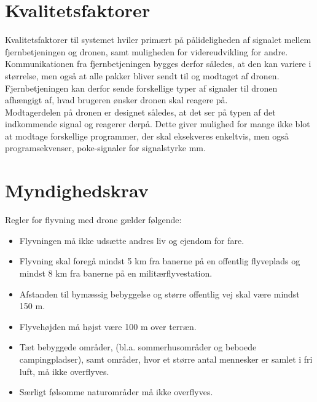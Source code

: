 \documentclass[Main]{subfiles}
\begin{document}
\chapter{Kvalitetsfaktorer}
Kvalitetsfaktorer til systemet hviler primært på pålideligheden af signalet mellem fjernbetjeningen og dronen, samt muligheden for videreudvikling for andre.
\\
Kommunikationen fra fjernbetjeningen bygges derfor således, at den kan variere i størrelse, men også at alle pakker bliver sendt til og modtaget af dronen.
Fjernbetjeningen kan derfor sende forskellige typer af signaler til dronen afhængigt af, hvad brugeren ønsker dronen skal reagere på.
\\
Modtagerdelen på dronen er designet således, at det ser på typen af det indkommende signal og reagerer derpå.
Dette giver mulighed for mange ikke blot at modtage forskellige programmer, der skal eksekveres enkeltvis, men også programsekvenser, poke-signaler for signalstyrke mm.











\chapter{Myndighedskrav}
Regler for flyvning med drone gælder følgende:

\begin{itemize}
\item Flyvningen må ikke udsætte andres liv og ejendom for fare\cite{Lov1}.
\item Flyvning skal foregå mindst 5 km fra banerne på en offentlig flyveplads og mindst 8 km fra banerne på en militærflyvestation\cite{Lov1}.
\item Afstanden til bymæssig bebyggelse og større offentlig vej skal være mindst 150 m\cite{Lov1}.
\item Flyvehøjden må højst være 100 m over terræn\cite{Lov1}.
\item Tæt bebyggede områder, (bl.a. sommerhusområder og beboede campingpladser), samt områder, hvor et større antal mennesker er samlet i fri luft, må ikke overflyves\cite{Lov1}.
\item Særligt følsomme naturområder må ikke overflyves\cite{Lov1}.
\end{itemize} 
\end{document}

